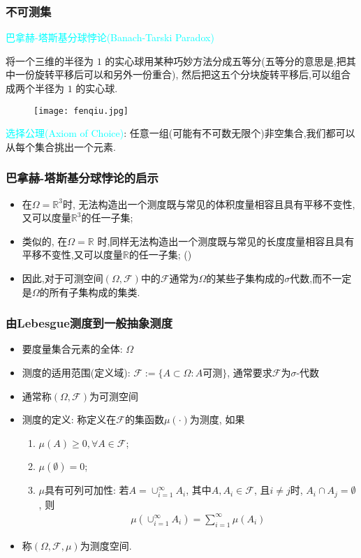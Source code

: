 \begin{frame}
	\frametitle{不可测集}
	\textcolor{cyan}{巴拿赫-塔斯基分球悖论({\rm Banach-Tarski Paradox})}

	\qquad   将一个三维的半径为 $1$ 的实心球用某种巧妙方法分成五等分(五等分的意思是,把其中一份旋转平移后可以和另外一份重合), 然后把这五个分块旋转平移后,可以组合成两个半径为 $1$ 的实心球.

	\begin{figure}[htbp]
		\centering
		\texttt{[image: fenqiu.jpg]}
	\end{figure}
	\pause
	\textcolor{cyan}{选择公理({\rm Axiom of Choice})}:  任意一组(可能有不可数无限个)非空集合,我们都可以从每个集合挑出一个元素.
\end{frame}

\begin{frame}
	\frametitle{巴拿赫-塔斯基分球悖论的启示}
	\begin{itemize}[<+-|alert@+>]
		\item  在$\Omega=\mathbb{R}^3$时, 无法构造出一个测度既与常见的体积度量相容且具有平移不变性,又可以度量$\mathbb{R}^3$的任一子集;
		\item 类似的, 在$\Omega=\mathbb{R}$ 时,同样无法构造出一个测度既与常见的长度度量相容且具有平移不变性,又可以度量$\mathbb{R}$的任一子集; ()
		\item 因此,对于可测空间$(\Omega,\mathcal{F})$中的$\mathcal{F}$通常为$\Omega$的某些子集构成的$\sigma$代数,而不一定是$\Omega$的所有子集构成的集类.

	\end{itemize}
\end{frame}

\begin{frame}
	\frametitle{ 由{\rm Lebesgue}测度到一般抽象测度}
	\begin{itemize}[<+-|alert@+>]
		\item 要度量集合元素的全体: $\Omega$
		\item 测度的适用范围(定义域): $\mathcal{F}:=\{A\subset \Omega:A\mbox{可测}\}$, 通常要求$\mathcal{F}$为$\sigma$-代数
		\item 通常称$(\Omega, \mathcal{F})$为可测空间
		\item 测度的定义: 称定义在$\mathcal{F}$的集函数$\mu(\cdot)$为测度, 如果
		\begin{enumerate}[<+-|alert@+>][(1)]
			\item $\mu(A)\ge 0, \forall A\in \mathcal{F}$;
			\item $\mu(\emptyset)=0$;
			\item $\mu$具有可列可加性: 若$A=\cup_{i=1}^{\infty}A_i$, 其中$A, A_i\in \mathcal{F}$,  且$i\neq j$时, $A_i\cap A_j=\emptyset$,  则
			\begin{eqnarray*}
				\mu(\cup_{i=1}^{\infty}A_i)=\sum_{i=1}^{\infty}\mu(A_i)
			\end{eqnarray*}

		\end{enumerate}
		\item  称$(\Omega,\mathcal{F},\mu)$为测度空间.
	\end{itemize}

\end{frame}

